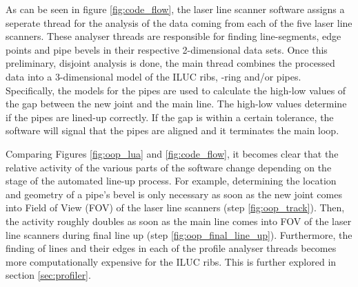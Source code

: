 As can be seen in figure \ref{fig:code_flow}, the laser line scanner software assigns a seperate thread for the analysis of the data coming from each of the five laser line scanners. These analyser threads are responsible for finding line-segments, edge points and pipe bevels in their respective 2-dimensional data sets. Once this preliminary, disjoint analysis is done, the main thread combines the processed data into a 3-dimensional model of the ILUC ribs, -ring and/or pipes. Specifically, the models for the pipes are used to calculate the high-low values of the gap between the new joint and the main line. The high-low values determine if the pipes are lined-up correctly. If the gap is within a certain tolerance, the software will signal that the pipes are aligned and it terminates the main loop.

Comparing Figures \ref{fig:oop_lua} and \ref{fig:code_flow}, it becomes clear that the relative activity of the various parts of the software change
depending on the stage of the automated line-up process. For example, determining the location and geometry of a pipe's bevel is only necessary as soon as
the new joint comes into Field of View (FOV) of the laser line scanners (step \ref{fig:oop_track}). Then, the activity roughly doubles as soon as the main line
comes into FOV of the laser line scanners during final line up (step \ref{fig:oop_final_line_up}). Furthermore, the finding of lines and their edges in each of the profile analyser threads becomes more computationally expensive for the ILUC ribs. This is further explored in section \ref{sec:profiler}.